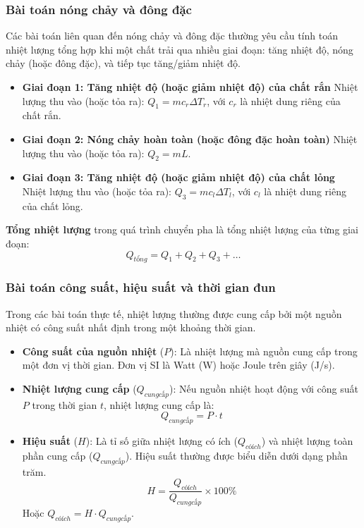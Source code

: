 \subsubsection{Bài toán nóng chảy và đông đặc}
\begin{kienthuc}
Các bài toán liên quan đến nóng chảy và đông đặc thường yêu cầu tính toán nhiệt lượng tổng hợp khi một chất trải qua nhiều giai đoạn: tăng nhiệt độ, nóng chảy (hoặc đông đặc), và tiếp tục tăng/giảm nhiệt độ.
\begin{itemize}
    \item \textbf{Giai đoạn 1: Tăng nhiệt độ (hoặc giảm nhiệt độ) của chất rắn}
    Nhiệt lượng thu vào (hoặc tỏa ra): $Q_1 = m c_r \Delta T_r$, với $c_r$ là nhiệt dung riêng của chất rắn.
    \item \textbf{Giai đoạn 2: Nóng chảy hoàn toàn (hoặc đông đặc hoàn toàn)}
    Nhiệt lượng thu vào (hoặc tỏa ra): $Q_2 = mL$.
    \item \textbf{Giai đoạn 3: Tăng nhiệt độ (hoặc giảm nhiệt độ) của chất lỏng}
    Nhiệt lượng thu vào (hoặc tỏa ra): $Q_3 = m c_l \Delta T_l$, với $c_l$ là nhiệt dung riêng của chất lỏng.
\end{itemize}
\textbf{Tổng nhiệt lượng} trong quá trình chuyển pha là tổng nhiệt lượng của từng giai đoạn:
\[ Q_{tổng} = Q_1 + Q_2 + Q_3 + \dots \]
\end{kienthuc}
\subsubsection{Bài toán công suất, hiệu suất và thời gian đun}

\begin{kienthuc}
Trong các bài toán thực tế, nhiệt lượng thường được cung cấp bởi một nguồn nhiệt có công suất nhất định trong một khoảng thời gian.
\begin{itemize}
    \item \textbf{Công suất của nguồn nhiệt} ($P$): Là nhiệt lượng mà nguồn cung cấp trong một đơn vị thời gian. Đơn vị SI là Watt (W) hoặc Joule trên giây (J/s).
    \item \textbf{Nhiệt lượng cung cấp} ($Q_{cung cấp}$): Nếu nguồn nhiệt hoạt động với công suất $P$ trong thời gian $t$, nhiệt lượng cung cấp là:
    \[ Q_{cung cấp} = P \cdot t \]
    \item \textbf{Hiệu suất} ($H$): Là tỉ số giữa nhiệt lượng có ích ($Q_{có ích}$) và nhiệt lượng toàn phần cung cấp ($Q_{cung cấp}$). Hiệu suất thường được biểu diễn dưới dạng phần trăm.
    \[ H = \frac{Q_{có ích}}{Q_{cung cấp}} \times 100\% \]
    Hoặc $Q_{có ích} = H \cdot Q_{cung cấp}$.
\end{itemize}
\end{kienthuc}

